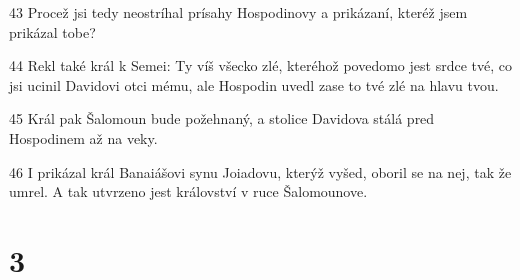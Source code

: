 \par 43 Procež jsi tedy neostríhal prísahy Hospodinovy a prikázaní, kteréž jsem prikázal tobe?
\par 44 Rekl také král k Semei: Ty víš všecko zlé, kteréhož povedomo jest srdce tvé, co jsi ucinil Davidovi otci mému, ale Hospodin uvedl zase to tvé zlé na hlavu tvou.
\par 45 Král pak Šalomoun bude požehnaný, a stolice Davidova stálá pred Hospodinem až na veky.
\par 46 I prikázal král Banaiášovi synu Joiadovu, kterýž vyšed, oboril se na nej, tak že umrel. A tak utvrzeno jest království v ruce Šalomounove.

\chapter{3}


